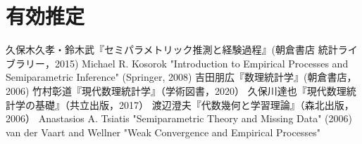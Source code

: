 \documentclass[uplatex,dvipdfmx]{jsreport}
\begin{document}
\chapter{有効推定}

\begin{thebibliography}{99}
    久保木久孝・鈴木武『セミパラメトリック推測と経験過程』(朝倉書店 統計ライブラリー，2015)
    Michael R. Kosorok "Introduction to Empirical Processes and Semiparametric Inference" (Springer, 2008)
    吉田朋広『数理統計学』(朝倉書店，2006)
    竹村彰道『現代数理統計学』（学術図書，2020）
    久保川達也『現代数理統計学の基礎』（共立出版，2017）
    渡辺澄夫『代数幾何と学習理論』（森北出版，2006）
    Anastasios A. Tsiatis "Semiparametric Theory and Missing Data" (2006)
    van der Vaart and Wellner "Weak Convergence and Empirical Processes"
\end{thebibliography}
\end{document}
